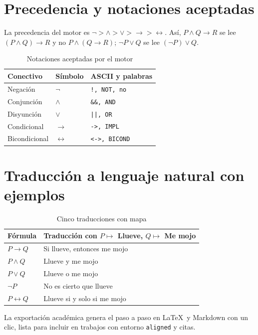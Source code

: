\documentclass[11pt,a4paper,openany]{book}
\begin{document}
\chapter{Precedencia y notaciones aceptadas}
\label{ch:precedencia}
La precedencia del motor es $\lnot > \land > \lor > \to > \leftrightarrow$. As\'i, $P \land Q \to R$ se lee $(P \land Q) \to R$ y no $P \land (Q \to R)$; $\lnot P \lor Q$ se lee $(\lnot P) \lor Q$.
\begin{table}[H]
\centering
\caption{Notaciones aceptadas por el motor}
\label{tab:notaciones}
\begin{tabular}{lll}
\toprule
Conectivo & S\'imbolo & ASCII y palabras \\
\midrule
Negaci\'on & $\lnot$ & \texttt{!, NOT, no} \\
Conjunci\'on & $\land$ & \texttt{\&\&, AND} \\
Disyunci\'on & $\lor$ & \texttt{||, OR} \\
Condicional & $\to$ & \texttt{->, IMPL} \\
Bicondicional & $\leftrightarrow$ & \texttt{<->, BICOND} \\
\bottomrule
\end{tabular}
\end{table}

\chapter{Traducci\'on a lenguaje natural con ejemplos}
\label{ch:traductor}
\begin{table}[H]
\centering
\caption{Cinco traducciones con mapa}
\label{tab:trad}
\begin{tabular}{ll}
\toprule
F\'ormula & Traducci\'on con $P \mapsto$ Llueve, $Q \mapsto$ Me mojo \\
\midrule
$P \to Q$ & Si llueve, entonces me mojo \\
$P \land Q$ & Llueve y me mojo \\
$P \lor Q$ & Llueve o me mojo \\
$\lnot P$ & No es cierto que llueve \\
$P \leftrightarrow Q$ & Llueve si y solo si me mojo \\
\bottomrule
\end{tabular}
\end{table}
La exportaci\'on acad\'emica genera el paso a paso en \LaTeX\ y Markdown con un clic, lista para incluir en trabajos con entorno \texttt{aligned} y citas.
\end{document}
